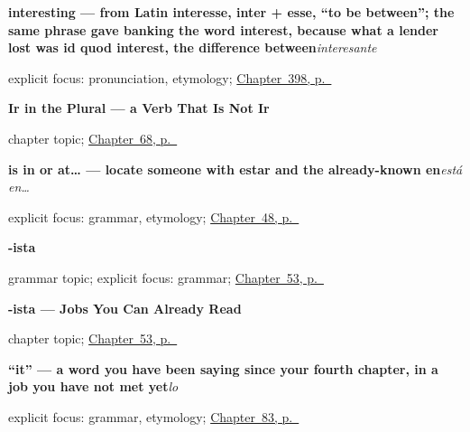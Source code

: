 \noindent\begin{minipage}[t]{\linewidth}
\raggedright
\textbf{interesting — from Latin interesse, inter + esse, \textquotedblleft{}to be between\textquotedblright{}; the same phrase gave banking the word interest, because what a lender lost was id quod interest, the difference between}\enspace\emph{interesante}\par
\footnotesize explicit focus: pronunciation, etymology; \hyperref[ch:importante-y-facil]{Chapter~398, p.~\pageref*{ch:importante-y-facil}}
\end{minipage}\par\smallskip

\noindent\begin{minipage}[t]{\linewidth}
\raggedright
\textbf{Ir in the Plural --- a Verb That Is Not Ir}\par
\footnotesize chapter topic; \hyperref[ch:spanish-ir-plural]{Chapter~68, p.~\pageref*{ch:spanish-ir-plural}}
\end{minipage}\par\smallskip

\noindent\begin{minipage}[t]{\linewidth}
\raggedright
\textbf{is in or at… — locate someone with estar and the already-known en}\enspace\emph{está en…}\par
\footnotesize explicit focus: grammar, etymology; \hyperref[ch:ser-y-estar]{Chapter~48, p.~\pageref*{ch:ser-y-estar}}
\end{minipage}\par\smallskip

\noindent\begin{minipage}[t]{\linewidth}
\raggedright
\textbf{-ista}\par
\footnotesize grammar topic; explicit focus: grammar; \hyperref[ch:ista]{Chapter~53, p.~\pageref*{ch:ista}}
\end{minipage}\par\smallskip

\noindent\begin{minipage}[t]{\linewidth}
\raggedright
\textbf{-ista --- Jobs You Can Already Read}\par
\footnotesize chapter topic; \hyperref[ch:ista]{Chapter~53, p.~\pageref*{ch:ista}}
\end{minipage}\par\smallskip

\noindent\begin{minipage}[t]{\linewidth}
\raggedright
\textbf{\textquotedblleft{}it\textquotedblright{} — a word you have been saying since your fourth chapter, in a job you have not met yet}\enspace\emph{lo}\par
\footnotesize explicit focus: grammar, etymology; \hyperref[ch:pronoun-lo]{Chapter~83, p.~\pageref*{ch:pronoun-lo}}
\end{minipage}\par\smallskip

